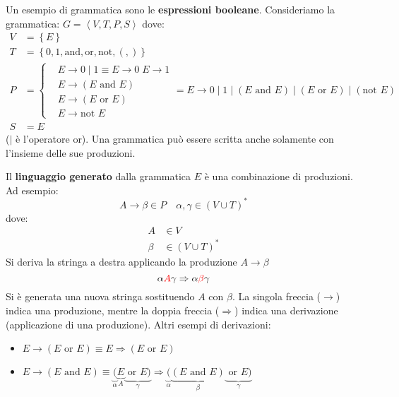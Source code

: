 \documentclass[a4paper]{article}
\begin{document}
\begin{example}
  Un esempio di grammatica sono le \textbf{espressioni booleane}.
  Consideriamo la grammatica: \( G = \left< V, T, P, S \right> \) dove:
  \[
    \begin{aligned}
      V &= \left\{ E \right\}\\
      T &= \left\{ 0, 1, \text{and}, \text{or}, \text{not}, (, ) \right\}\\
      P &= \left\{
        \begin{aligned}
          &E \to 0 \;|\; 1 \equiv E \to 0 \; E \to 1\\
          &E \to (E \text{ and } E)\\
          &E \to (E \text{ or } E)\\
          &E \to \text{not } E
        \end{aligned}
      \right. = 
      E \to 0 \;|\; 1 \;|\; (E \text{ and } E) \;|\; (E \text{ or } E) \;|\; (\text{not } E)
      \\
        S &= E
    \end{aligned}
  \] 
  (\( | \) è l'operatore or). Una grammatica può essere scritta anche solamente con
  l'insieme delle sue produzioni.

  \vspace{1em}
  \noindent
  Il \textbf{linguaggio generato} dalla grammatica \( E \) è una combinazione di
  produzioni. Ad esempio:
  \[
    A \to \beta \in P \quad \alpha, \gamma \in (V \cup T)^*
  \] 
  dove:
  \[
  \begin{aligned}
    A &\in V\\
    \beta &\in (V \cup T)^*
  \end{aligned}
  \] 
  Si deriva la stringa a destra applicando la produzione \( A \to \beta \) 
  \[
    \alpha \color{red}A\color{black} \gamma \Rightarrow \alpha \color{red}\beta\color{black} \gamma
  \] 
  Si è generata una nuova stringa sostituendo \( A \) con \( \beta \).
  \noindent
  La singola freccia (\( \to  \)) indica una produzione, mentre la doppia freccia
  (\( \Rightarrow \)) indica una derivazione (applicazione di una produzione).
  \label{28-10-D1}
  \noindent
  Altri esempi di derivazioni:
  \begin{itemize}
    \item \( E \to (E \text{ or } E) \equiv E \Rightarrow (E \text{ or } E) \) 
    \item \( E \to (E \text{ and } E) \equiv
      \underbrace{(}_{\alpha}\underbrace{E}_{A} \underbrace{\text{ or } E)}_{\gamma } \Rightarrow
      \underbrace{(}_{\alpha}\underbrace{(E \text{ and } E)}_{\beta} \underbrace{\text{ or } E)}_{\gamma} \)
  \end{itemize}
\end{example}
\end{document}
